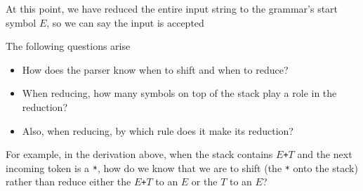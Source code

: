 \documentclass[8pt,a4paper,compress]{beamer}
\begin{document}
\begin{frame}[fragile]
\pause
\bigskip

At this point, we have reduced the entire input string to the grammar's start symbol $E$, so we can say the input is accepted
\end{frame}

\begin{frame}[fragile]
\pause

The following questions arise
\begin{itemize}
\item How does the parser know when to shift and when to reduce?
\item When reducing, how many symbols on top of the stack play a role in the reduction?
\item Also, when reducing, by which rule does it make its reduction?
\end{itemize}

\pause
\bigskip

For example, in the derivation above, when the stack contains $E$\lstinline{+}$T$ and the next incoming token is a \lstinline{*}, how do we know that we are to shift (the \lstinline{*} onto the stack) rather than reduce either the $E$\lstinline{+}$T$ to an $E$ or the $T$ to an $E$?
\end{frame}
\end{document}
